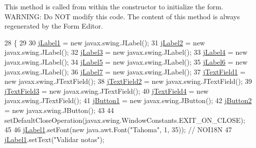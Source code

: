 This method is called from within the constructor to initialize the form. W\+A\+R\+N\+I\+NG\+: Do N\+OT modify this code. The content of this method is always regenerated by the Form Editor. 
\begin{DoxyCode}
28                                   \{
29 
30         \mbox{\hyperlink{classsoftware_1_1ponernotas_ac17144972e22b9105abd7154befd195a}{jLabel1}} = \textcolor{keyword}{new} javax.swing.JLabel();
31         \mbox{\hyperlink{classsoftware_1_1ponernotas_ab381c20a9538313f7d4a5b39b0a96325}{jLabel2}} = \textcolor{keyword}{new} javax.swing.JLabel();
32         \mbox{\hyperlink{classsoftware_1_1ponernotas_a35f1e77968f139680ed7404f94dada6f}{jLabel3}} = \textcolor{keyword}{new} javax.swing.JLabel();
33         \mbox{\hyperlink{classsoftware_1_1ponernotas_a85fb8af1244048f39a9d8864e8ef6744}{jLabel4}} = \textcolor{keyword}{new} javax.swing.JLabel();
34         \mbox{\hyperlink{classsoftware_1_1ponernotas_ab1d9cabe505eb0024a31ce142ab2ca0d}{jLabel5}} = \textcolor{keyword}{new} javax.swing.JLabel();
35         \mbox{\hyperlink{classsoftware_1_1ponernotas_ac94bb41bd989a69788d89b0522ecba91}{jLabel6}} = \textcolor{keyword}{new} javax.swing.JLabel();
36         \mbox{\hyperlink{classsoftware_1_1ponernotas_ae60c32ed6ba0e002b935d38c6d9378a3}{jLabel7}} = \textcolor{keyword}{new} javax.swing.JLabel();
37         \mbox{\hyperlink{classsoftware_1_1ponernotas_a6ea3d65f0c7fddc1b3c983e9ed0e6939}{jTextField1}} = \textcolor{keyword}{new} javax.swing.JTextField();
38         \mbox{\hyperlink{classsoftware_1_1ponernotas_a3cc94d5b5bd1181f042f71bcbe418e5f}{jTextField2}} = \textcolor{keyword}{new} javax.swing.JTextField();
39         \mbox{\hyperlink{classsoftware_1_1ponernotas_a75f364eec0a40fc2d42d6387ea73baaf}{jTextField3}} = \textcolor{keyword}{new} javax.swing.JTextField();
40         \mbox{\hyperlink{classsoftware_1_1ponernotas_a4939c719c7aae97334352b7c4d9fcbf2}{jTextField4}} = \textcolor{keyword}{new} javax.swing.JTextField();
41         \mbox{\hyperlink{classsoftware_1_1ponernotas_ab5d7404242d2345a5e4b00f8816b4834}{jButton1}} = \textcolor{keyword}{new} javax.swing.JButton();
42         \mbox{\hyperlink{classsoftware_1_1ponernotas_a5c280378d6fe6477170e9ede3ac8ae98}{jButton2}} = \textcolor{keyword}{new} javax.swing.JButton();
43 
44         setDefaultCloseOperation(javax.swing.WindowConstants.EXIT\_ON\_CLOSE);
45 
46         \mbox{\hyperlink{classsoftware_1_1ponernotas_ac17144972e22b9105abd7154befd195a}{jLabel1}}.setFont(\textcolor{keyword}{new} java.awt.Font(\textcolor{stringliteral}{"Tahoma"}, 1, 35)); \textcolor{comment}{// NOI18N}
47         \mbox{\hyperlink{classsoftware_1_1ponernotas_ac17144972e22b9105abd7154befd195a}{jLabel1}}.setText(\textcolor{stringliteral}{"Validar notas"});

\end{DoxyCode}
